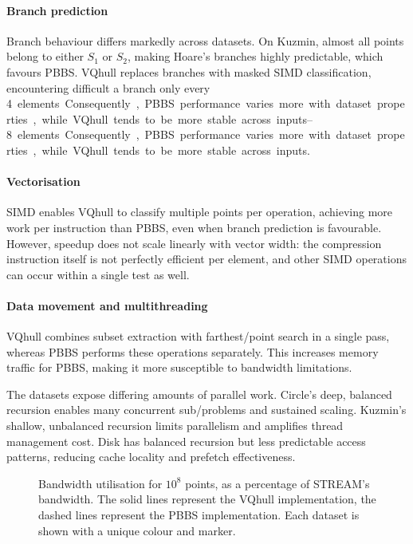 \documentclass[11pt,a4paper]{article}
\begin{document}
\paragraph{Branch prediction}
Branch behaviour differs markedly across datasets.
On Kuzmin, almost all points belong to either $S_1$ or $S_2$, making Hoare's branches highly predictable, which favours PBBS.
VQhull replaces branches with masked SIMD classification, encountering difficult a branch only every \qtyrange{4}{8} elements.
Consequently, PBBS performance varies more with dataset properties, while VQhull tends to be more stable across inputs.

\paragraph{Vectorisation}
SIMD enables VQhull to classify multiple points per operation, achieving more work per instruction than PBBS, even when branch prediction is favourable.
However, speedup does not scale linearly with vector width: the compression instruction itself is not perfectly efficient per element, and other SIMD operations can occur within a single test as well.

\paragraph{Data movement and multithreading}
VQhull combines subset extraction with farthest\-/point search in a single pass, whereas PBBS performs these operations separately.
This increases memory traffic for PBBS, making it more susceptible to bandwidth limitations.

The datasets expose differing amounts of parallel work.
Circle's deep, balanced recursion enables many concurrent sub\-/problems and sustained scaling.
Kuzmin's shallow, unbalanced recursion limits parallelism and amplifies thread management cost.
Disk has balanced recursion but less predictable access patterns, reducing cache locality and prefetch effectiveness.

\begin{figure}[t]
  \begin{subfigure}[b]{0.33\linewidth}
    \centering
  \end{subfigure}%
  \hfill
  \begin{subfigure}[b]{0.33\linewidth}
    \centering
  \end{subfigure}%
  \hfill
  \begin{subfigure}[b]{0.33\linewidth}
    \centering
  \end{subfigure}%
  \caption{Bandwidth utilisation for $10^8$ points, as a percentage of STREAM's bandwidth.
  The solid lines represent the VQhull implementation, the dashed lines represent the PBBS implementation.
  Each dataset is shown with a unique colour and marker.}%
  \label{fig:bw}%
\end{figure}
\end{document}
